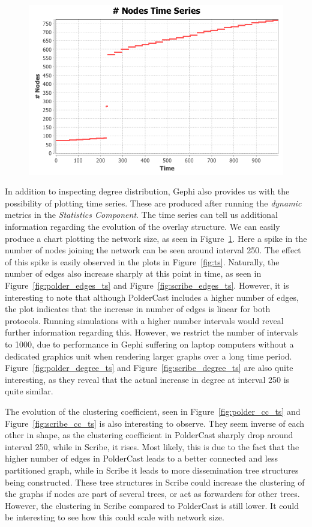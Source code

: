 \begin{figure}[Ht]
    \centering
    \includegraphics[scale=0.5]{plots/polder_nodes_ts}
    \label{fig:polder_node_ts}
\end{figure}

In addition to inspecting degree distribution, Gephi also provides us
with the possibility of plotting time series. These are produced after
running the \emph{dynamic} metrics in the \emph{Statistics Component}.
The time series can tell us additional information regarding the
evolution of the overlay structure. We can easily produce a chart
plotting the network size, as seen in Figure~\ref{fig:polder_node_ts}.
Here a spike in the number of nodes joining the network can be seen
around interval 250. The effect of this spike is easily observed in the
plots in Figure~\ref{fig:ts}. Naturally, the number of edges also
increase sharply at this point in time, as seen in
Figure~\ref{fig:polder_edges_ts} and Figure~\ref{fig:scribe_edges_ts}.
However, it is interesting to note that although PolderCast includes a
higher number of edges, the plot indicates that the increase in number
of edges is linear for both protocols. Running simulations with a higher
number intervals would reveal further information regarding this.
However, we restrict the number of intervals to 1000, due to performance
in Gephi suffering on laptop computers without a dedicated graphics unit
when rendering larger graphs over a long time period.
Figure~\ref{fig:polder_degree_ts} and Figure~\ref{fig:scribe_degree_ts}
are also quite interesting, as they reveal that the actual increase in
degree at interval 250 is quite similar.

The evolution of the clustering coefficient, seen in
Figure~\ref{fig:polder_cc_ts} and Figure~\ref{fig:scribe_cc_ts} is also
interesting to observe. They seem inverse of each other in shape, as the
clustering coefficient in PolderCast sharply drop around interval 250,
while in Scribe, it rises. Most likely, this is due to the fact that the
higher number of edges in PolderCast leads to a better connected and
less partitioned graph, while in Scribe it leads to more dissemination
tree structures being constructed. These tree structures in Scribe could
increase the clustering of the graphs if nodes are part of several
trees, or act as forwarders for other trees. However, the clustering in
Scribe compared to PolderCast is still lower. It could be interesting to
see how this could scale with network size.

